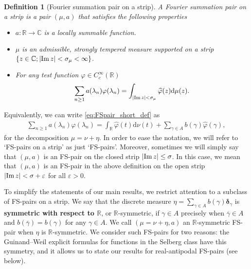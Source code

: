 \documentclass[a4paper,reqno,12pt]{amsart}
\newtheorem{definition}{Definition}
\renewcommand{\r}{\mathbb{R}}
\newcommand{\cp}{\mathbb{C}} %
\newcommand{\ft}{\widehat}
\newcommand{\bo}{\boldsymbol}
\newcommand{\la}{\lambda}
\newcommand{\ga}{\gamma}
\newcommand{\ep}{\varepsilon}
\newcommand{\si}{\sigma}
\newcommand{\p}{\varphi}
\renewcommand{\d}{\mathrm{d}}
\newcommand{\ov}[1]{\overline{#1}}
\newcommand{\1}{{\bf 1}}
\newcommand{\ra}{\rightarrow}
\newcommand{\del}{{\bo \delta}}
\renewcommand{\Im}{{\rm Im}\,}
\begin{document}
\begin{definition}[Fourier summation pair on a strip]
A Fourier summation pair on a strip is a pair $(\mu,a)$ that satisfies the following properties
\begin{itemize}
    \item[i)] $a:\r\ra\cp$ is a locally summable function.
    \item[ii)] $\mu$ is an admissible, strongly tempered measure supported on a strip $\{z\in\cp;|\Im{z}|<\si_\mu<\infty\}$.
    \item[iii)] For any test function $\p\in C^\infty_c(\r)$ \begin{align}
\label{eq:FSpair_short_def}
    \sum_{n\geq1} a(\la_n)\p(\la_n)=\int_{|\Im{z}|<\si_\mu} \ft{\p}(z)\d\mu(z).
\end{align}
\end{itemize}
\end{definition}
Equivalently, we can write \eqref{eq:FSpair_short_def} as
\begin{align}
\label{eq:FSpair_def}
    \sum_{n\geq1} a(\la_n)\p(\la_n)=\int_{\r} \ft{\p}(t)\d\nu(t)+\sum_{\ga\in A} b(\ga)\ft{\p}(\ga),
\end{align}
for the decomposition $\mu=\nu+\eta$. In order to ease the notation, we will refer to `FS-pairs on a strip' as just `FS-pairs'. Moreover, sometimes we will simply say that $(\mu,a)$ is an FS-pair on the closed strip $|\Im{z}|\leq\sigma$. In this case, we mean that $(\mu,a)$ is an FS-pair in the above definition on the open strip $|\Im{z}|<\sigma+\ep$ for all $\ep>0$.

To simplify the statements of our main results, we restrict attention to a subclass of FS-pairs on a strip. We say that the discrete measure $\eta=\sum_{\ga\in A} b(\ga)\del_\ga$ is \textbf{symmetric with respect to $\r$}, or $\r$-symmetric, if $\ga\in A$ precisely when $\ov{\ga}\in A$ and $b(\ov{\ga})=b(\ga)$ for any $\ga\in A$. We call $(\mu=\nu+\eta,a)$ an $\r$-symmetric FS-pair when $\eta$ is $\r$-symmetric. We consider such FS-pairs for two reasons: the Guinand--Weil explicit formulas for functions in the Selberg class have this symmetry, and it allows us to state our results for real-antipodal FS-pairs (see below).
\end{document}
